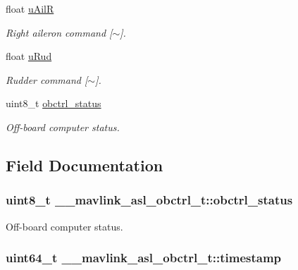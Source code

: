 \begin{DoxyCompactItemize}
float \hyperlink{struct____mavlink__asl__obctrl__t_a610cf9220c5fcb44a1497d91cb8b3320}{u\+Ail\+R}
\begin{DoxyCompactList}\small\item\em Right aileron command \mbox{[}$\sim$\mbox{]}. \end{DoxyCompactList}\item 
float \hyperlink{struct____mavlink__asl__obctrl__t_a0a900f213e6969fd40756334a123daf7}{u\+Rud}
\begin{DoxyCompactList}\small\item\em Rudder command \mbox{[}$\sim$\mbox{]}. \end{DoxyCompactList}\item 
uint8\+\_\+t \hyperlink{struct____mavlink__asl__obctrl__t_ae5878df33675019740bcf52144ea5d01}{obctrl\+\_\+status}
\begin{DoxyCompactList}\small\item\em Off-\/board computer status. \end{DoxyCompactList}\end{DoxyCompactItemize}


\subsection{Field Documentation}
\hypertarget{struct____mavlink__asl__obctrl__t_ae5878df33675019740bcf52144ea5d01}{
\subsubsection[{obctrl\+\_\+status}]{\setlength{\rightskip}{0pt plus 5cm}uint8\+\_\+t \+\_\+\+\_\+mavlink\+\_\+asl\+\_\+obctrl\+\_\+t\+::obctrl\+\_\+status}}\label{struct____mavlink__asl__obctrl__t_ae5878df33675019740bcf52144ea5d01}


Off-\/board computer status. 

\hypertarget{struct____mavlink__asl__obctrl__t_a0626e4a249c6a27b041c655f75454186}{
\subsubsection[{timestamp}]{\setlength{\rightskip}{0pt plus 5cm}uint64\+\_\+t \+\_\+\+\_\+mavlink\+\_\+asl\+\_\+obctrl\+\_\+t\+::timestamp}}\label{struct____mavlink__asl__obctrl__t_a0626e4a249c6a27b041c655f75454186}


